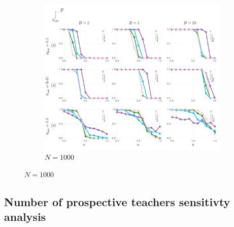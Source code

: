 \documentclass[letterpaper,11.5pt]{scrartcl}
\begin{document}
\begin{figure}
  \ContinuedFloat
	\begin{subfigure}{\textwidth}
	  \caption{$N=1000$}
	  \includegraphics[width=\textwidth]{Figures/supplement/nagents=1000/mainResultsPlots.pdf}
	\end{subfigure}
\end{figure}



\newpage
\subsection{Number of prospective teachers sensitivty analysis}
\end{document}
